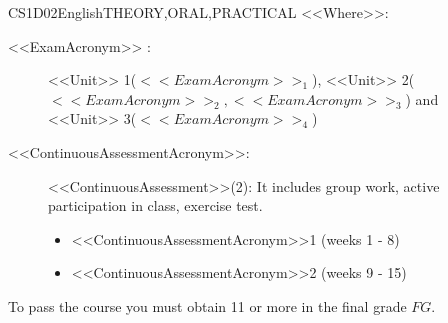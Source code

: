 \begin{evaluation}{CS1D02}{English}{THEORY,ORAL,PRACTICAL}
  \vspace{2mm}
  \noindent <<Where>>:
  \begin{description}
      \item[<<ExamAcronym>> :] <<Unit>> 1($<<ExamAcronym>>_{1}$), <<Unit>> 2($<<ExamAcronym>>_{2}, <<ExamAcronym>>_{3}$) and <<Unit>> 3($<<ExamAcronym>>_{4}$) 
      \item[<<ContinuousAssessmentAcronym>>:]<<ContinuousAssessment>>(2): It includes group work, active participation in class, exercise test.
        \begin{itemize}
              \item <<ContinuousAssessmentAcronym>>1 (weeks 1 - 8) 
              \item <<ContinuousAssessmentAcronym>>2 (weeks 9 - 15)
        \end{itemize}
  \end{description}
 
  \noindent To pass the course you must obtain 11 or more in the final grade $FG$.
  \end{evaluation}
 


